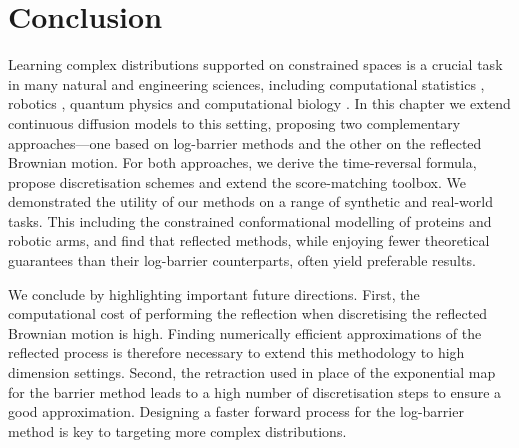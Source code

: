 \section{Conclusion}

Learning complex distributions supported on constrained spaces is a crucial task in many natural and engineering sciences, including computational statistics \parencite{Morris2002}, robotics \parencite{han2006inverse}, quantum physics \parencite{lukens2020practical} and computational biology \parencite{Thiele2013}.
In this chapter we extend continuous diffusion models to this setting, proposing two complementary approaches---one based on log-barrier methods and the other on the reflected Brownian motion.
For both approaches, we derive the time-reversal formula, propose discretisation schemes and extend the score-matching toolbox.
We demonstrated the utility of our methods on a range of synthetic and real-world tasks.
This including the constrained conformational modelling of proteins and robotic arms, and find that reflected methods, while enjoying fewer theoretical guarantees than their log-barrier counterparts, often yield preferable results.

We conclude by highlighting important future directions.
First, the computational cost of performing the reflection when discretising the reflected Brownian motion is high.
Finding numerically efficient approximations of the reflected process is therefore necessary to extend this methodology to high dimension settings.
Second, the retraction used in place of the exponential map for the barrier method leads to a high number of discretisation steps to ensure a good approximation.
Designing a faster forward process for the log-barrier method is key to targeting more complex distributions.


